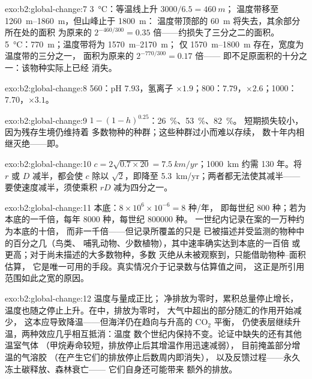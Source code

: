\begin{solution}{exo:b2:global-change:7}
\qty{3}{\celsius}：等温线上升 $3000/6.5 = \qty{460}{m}$；
温度带移至 \qtyrange{1260}{1860}{m}，但山峰止于 \qty{1800}{m}：
温度带顶部的 \qty{60}{m} 将失去，其余部分所在处的面积
为原来的 $2^{-460/300} = 0.35$ 倍——约损失了三分之二的面积。
\qty{5}{\celsius}：\qty{770}{m}；温度带将为 \qtyrange{1570}{2170}{m}；
仅 \qtyrange{1570}{1800}{m} 存在，宽度为温度带的三分之一，
面积为原来的 $2^{-770/300} = 0.17$ 倍——
即不足原面积的十分之一：该物种实际上已经
消失。
\end{solution}

\begin{solution}{exo:b2:global-change:8}
560：pH $7.93$，氢离子 $\times 1.9$；800：$7.79$，$\times
2.6$；1000：$7.70$，$\times 3.1$。
\end{solution}

\begin{solution}{exo:b2:global-change:9}
$1 - (1 - h)^{0.25}$：\qty{26}{\%}、\qty{53}{\%}、\qty{82}{\%}。
短期损失较小，因为残存生境仍维持着
多数物种的种群；这些种群过小而难以存续，
数十年内相继灭绝——即。
\end{solution}

\begin{solution}{exo:b2:global-change:10}
$c = 2\sqrt{0.7\times 20} = \qty{7.5}{km/yr}$；\qty{1000}{km}
约需 130 年。将 $r$ 或 $D$ 减半，都会使 $c$ 除以
$\sqrt 2$，即降至 \qty{5.3}{km/yr}；两者都无法使其减半——
要使速度减半，须使乘积 $rD$ 减为四分之一。
\end{solution}

\begin{solution}{exo:b2:global-change:11}
本底：$8\times 10^{6}\times 10^{-6} = 8$ 种/年，
即每世纪 800 种；若为本底的一千倍，每年 8000 种，每世纪 \num{800000} 种。
一世纪内记录在案的一万种约为本底的十倍，
而非一千倍——但记录所覆盖的只是
已被描述并受监测的物种中的百分之几（鸟类、
哺乳动物、少数植物），其中速率确实达到本底的一百倍
或更高；对于尚未描述的大多数物种，多数
灭绝从未被观察到，只能借助物种–面积估算，
它是唯一可用的手段。真实情况介于记录数与估算值之间，
这正是所引用范围如此之宽的原因。
\end{solution}

\begin{solution}{exo:b2:global-change:12}
温度与量成正比；
净排放为零时，累积总量停止增长，
温度也随之停止上升。在中，排放为零时，
大气中超出的部分随汇的作用开始减少，
这本应导致降温——但海洋仍在趋向与升高的 \ensuremath{\mathrm{CO_2}} 平衡，
仍使表层继续升温，两种效应几乎相互抵消：温度
数个世纪内保持不变。论证中缺失的还有其他温室气体
（甲烷寿命较短，排放停止后其增温作用迅速减弱），
目前掩盖部分增温的气溶胶
（在产生它们的排放停止后数周内即消失），
以及反馈过程——永久冻土碳释放、森林衰亡——
它们自身还可能带来
额外的排放。
\end{solution}

